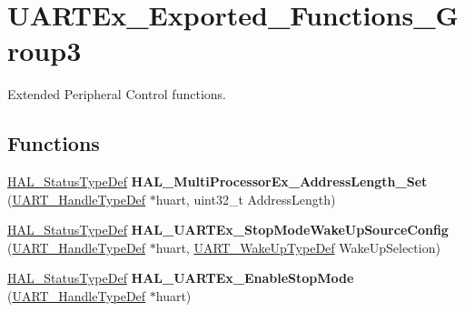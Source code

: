 \hypertarget{group___u_a_r_t_ex___exported___functions___group3}{}\section{U\+A\+R\+T\+Ex\+\_\+\+Exported\+\_\+\+Functions\+\_\+\+Group3}
\label{group___u_a_r_t_ex___exported___functions___group3}


Extended Peripheral Control functions.  


\subsection*{Functions}
\begin{DoxyCompactItemize}
\item 
\mbox{\label{group___u_a_r_t_ex___exported___functions___group3_gabb9d4edfed47241a86a304856cb4e3c6}} 
\hyperlink{stm32f0xx__hal__def_8h_a63c0679d1cb8b8c684fbb0632743478f}{H\+A\+L\+\_\+\+Status\+Type\+Def} {\bfseries H\+A\+L\+\_\+\+Multi\+Processor\+Ex\+\_\+\+Address\+Length\+\_\+\+Set} (\hyperlink{struct_u_a_r_t___handle_type_def}{U\+A\+R\+T\+\_\+\+Handle\+Type\+Def} $\ast$huart, uint32\+\_\+t Address\+Length)
\item 
\mbox{\label{group___u_a_r_t_ex___exported___functions___group3_gaab6cd801f4e343b1d6f8478c2575c3bf}} 
\hyperlink{stm32f0xx__hal__def_8h_a63c0679d1cb8b8c684fbb0632743478f}{H\+A\+L\+\_\+\+Status\+Type\+Def} {\bfseries H\+A\+L\+\_\+\+U\+A\+R\+T\+Ex\+\_\+\+Stop\+Mode\+Wake\+Up\+Source\+Config} (\hyperlink{struct_u_a_r_t___handle_type_def}{U\+A\+R\+T\+\_\+\+Handle\+Type\+Def} $\ast$huart, \hyperlink{struct_u_a_r_t___wake_up_type_def}{U\+A\+R\+T\+\_\+\+Wake\+Up\+Type\+Def} Wake\+Up\+Selection)
\item 
\mbox{\label{group___u_a_r_t_ex___exported___functions___group3_gad113d7b5cd162ca36e706d812801b5ab}} 
\hyperlink{stm32f0xx__hal__def_8h_a63c0679d1cb8b8c684fbb0632743478f}{H\+A\+L\+\_\+\+Status\+Type\+Def} {\bfseries H\+A\+L\+\_\+\+U\+A\+R\+T\+Ex\+\_\+\+Enable\+Stop\+Mode} (\hyperlink{struct_u_a_r_t___handle_type_def}{U\+A\+R\+T\+\_\+\+Handle\+Type\+Def} $\ast$huart)
\item 

\end{DoxyCompactItemize}

